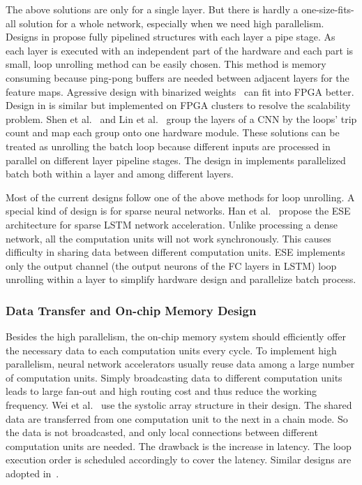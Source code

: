 The above solutions are only for a single layer. But there is hardly a one-size-fits-all solution for a whole network, especially when we need high parallelism. Designs in \cite{li2016high, liu2016automatic} propose fully pipelined structures with each layer a pipe stage. As each layer is executed with an independent part of the hardware and each part is small, loop unrolling method can be easily chosen. This method is memory consuming because ping-pong buffers are needed between adjacent layers for the feature maps. Agressive design with binarized weights~\cite{yang2018fully} can fit into FPGA better. Design in \cite{zhang2016energy} is similar but implemented on FPGA clusters to resolve the scalability problem. Shen et al.~\cite{shen2016overcoming} and Lin et al.~\cite{lin2018lcp} group the layers of a CNN by the loops' trip count and map each group onto one hardware module. These solutions can be treated as unrolling the batch loop because different inputs are processed in parallel on different layer pipeline stages. The design in \cite{lu2017evaluating} implements parallelized batch both within a layer and among different layers. 

Most of the current designs follow one of the above methods for loop unrolling. A special kind of design is for sparse neural networks. Han et al.~\cite{han2017ese} propose the ESE architecture for sparse LSTM network acceleration. Unlike processing a dense network, all the computation units will not work synchronously. This causes difficulty in sharing data between different computation units. ESE implements only the output channel (the output neurons of the FC layers in LSTM) loop unrolling within a layer to simplify hardware design and parallelize batch process.

\subsubsection{Data Transfer and On-chip Memory Design}

Besides the high parallelism, the on-chip memory system should efficiently offer the necessary data to each computation units every cycle. To implement high parallelism, neural network accelerators usually reuse data among a large number of computation units. Simply broadcasting data to different computation units leads to large fan-out and high routing cost and thus reduce the working frequency. Wei et al.~\cite{wei2017automated} use the systolic array structure in their design. The shared data are transferred from one computation unit to the next in a chain mode. So the data is not broadcasted, and only local connections between different computation units are needed. The drawback is the increase in latency. The loop execution order is scheduled accordingly to cover the latency. Similar designs are adopted in~\cite{aydonat2017opencl, ma2017optimizing}. 

